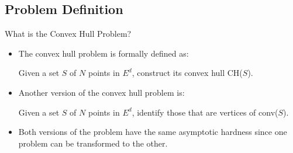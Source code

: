 \documentclass{beamer}
\begin{document}
\subsection{Problem Definition}
\begin{frame}{What is the Convex Hull Problem?}
    \begin{itemize}
        \item The convex hull problem is formally defined as:
        \begin{center}
        \begin{minipage}{0.75\textwidth}
          \begin{center}
            Given a set $S$ of $N$ points in $E^d$, construct its convex hull CH($S$).
          \end{center}
        \end{minipage}
      \end{center}
      \vspace{1 em}
      \item Another version of the convex hull problem is:
      \begin{center}
        \begin{minipage}{0.75\textwidth}
          \begin{center}
            Given a set $S$ of $N$ points in $E^d$, identify those that are vertices of conv($S$). 
          \end{center}
        \end{minipage}
      \end{center}
      \vspace{1 em}
      \item Both versions of the problem have the same asymptotic hardness since one problem can be 
      transformed to the other. 
    \end{itemize}    
\end{frame}
\end{document}
